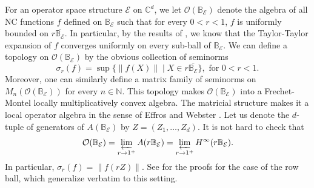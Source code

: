 \documentclass[12pt]{amsart}
\numberwithin{equation}{section}
\theoremstyle{definition}
\newcommand{\cE}{\mathcal{E}}
\newcommand{\cO}{\mathcal{O}}
\newcommand{\bB}{\mathbb{B}}
\newcommand{\C}{\mathbb{C}}
\newcommand{\bN}{\mathbb{N}}
\begin{document}
For an operator space structure $\cE$ on $\C^d$, we let $\cO(\bB_{\cE})$ denote the algebra of all NC functions $f$ defined on $\bB_{\cE}$ such that for every $0 < r < 1$, $f$ is uniformly bounded on $r \overline{\bB_{\cE}}$. In particular, by the results of \cite{KVV}, we know that the Taylor-Taylor expansion of $f$ converges uniformly on every sub-ball of $\bB_{\cE}$. We can define a topology on $\cO(\bB_{\cE})$ by the obvious collection of seminorms
\[
\sigma_r(f) = \sup\{ \|f(X)\| \mid X \in r \overline{\bB_{\cE}} \}, \text{ for } 0 < r < 1.
\]
Moreover, one can similarly define a matrix family of seminorms on $M_n(\cO(\bB_{\cE}))$ for every $n \in \bN$. This topology makes $\cO(\bB_{\cE})$ into a Frechet-Montel locally multiplicatively convex algebra. The matricial structure makes it a local operator algebra in the sense of Effros and Webster \cite{EffWeb}. Let us denote the $d$-tuple of generators of $A(\bB_{\cE})$ by $Z = (Z_1,\ldots,Z_d)$. It is not hard to check that
\[
\cO(\bB_{\cE}) = \varprojlim_{r \to 1^+} A(r \bB_{\cE}) = \varprojlim_{r \to 1^+} H^{\infty}(r\bB_{\cE}).
\]
In particular, $\sigma_r(f) = \|f(rZ)\|$. See \cite{AMS-entires} for the proofs for the case of the row ball, which generalize verbatim to this setting.
\end{document}
